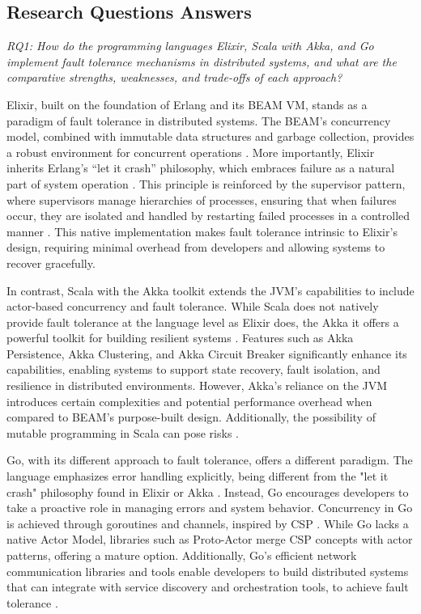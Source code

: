 \subsection{Research Questions Answers}

\textit{RQ1: How do the programming languages Elixir, Scala with Akka, and Go implement fault tolerance mechanisms in distributed systems, and what are the comparative strengths, weaknesses, and trade-offs of each approach?}

Elixir, built on the foundation of Erlang and its \gls{BEAM} \gls{VM}, stands as a paradigm of fault tolerance in distributed systems. The \gls{BEAM}'s concurrency model, combined with immutable data structures and garbage collection, provides a robust environment for concurrent operations \cite{Juric2024}. More importantly, Elixir inherits Erlang’s “let it crash” philosophy, which embraces failure as a natural part of system operation \cite{Armstrong2013}. This principle is reinforced by the supervisor pattern, where supervisors manage hierarchies of processes, ensuring that when failures occur, they are isolated and handled by restarting failed processes in a controlled manner \cite{Juric2024}. This native implementation makes fault tolerance intrinsic to Elixir’s design, requiring minimal overhead from developers and allowing systems to recover gracefully.

In contrast, Scala with the Akka toolkit extends the JVM’s capabilities to include actor-based concurrency and fault tolerance. While Scala does not natively provide fault tolerance at the language level as Elixir does, the Akka it offers a powerful toolkit for building resilient systems \cite{akka-docs,Abraham2023}. Features such as Akka Persistence, Akka Clustering, and Akka Circuit Breaker significantly enhance its capabilities, enabling systems to support state recovery, fault isolation, and resilience in distributed environments. However, Akka’s reliance on the JVM introduces certain complexities and potential performance overhead when compared to BEAM’s purpose-built design. Additionally, the possibility of mutable programming in Scala can pose risks \cite{akka-docs}.

Go, with its different approach to fault tolerance, offers a different paradigm. The language emphasizes error handling explicitly, being different from the "let it crash" philosophy found in Elixir or Akka \cite{go-docs}. Instead, Go encourages developers to take a proactive role in managing errors and system behavior. Concurrency in Go is achieved through goroutines and channels, inspired by \gls{CSP} \cite{proto-actor-docs}. While Go lacks a native Actor Model, libraries such as Proto-Actor merge CSP concepts with actor patterns, offering a mature option. Additionally, Go’s efficient network communication libraries and tools enable developers to build distributed systems that can integrate with service discovery and orchestration tools, to achieve fault tolerance \cite{Shuiskov2022}.

